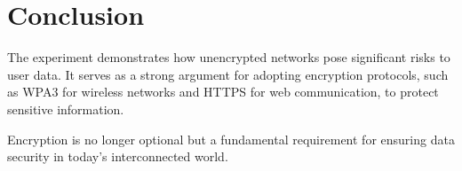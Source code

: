 \section{Conclusion}

The experiment demonstrates how unencrypted networks pose significant risks to user data. It serves as a strong argument for adopting encryption protocols, such as WPA3 for wireless networks and HTTPS for web communication, to protect sensitive information.

Encryption is no longer optional but a fundamental requirement for ensuring data security in today's interconnected world.

